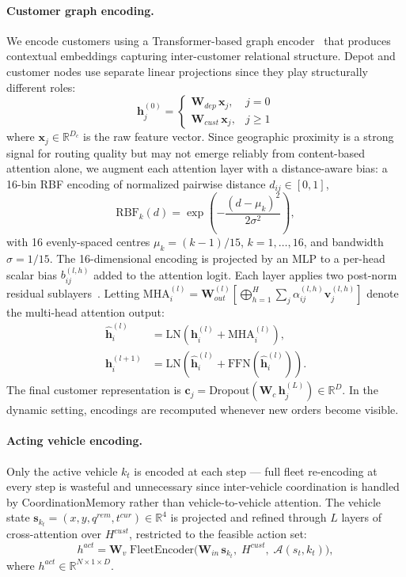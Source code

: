 \paragraph{Customer graph encoding.}
We encode customers using a Transformer-based graph encoder~\cite{vaswani2017attention} that produces contextual embeddings capturing inter-customer relational structure.
Depot and customer nodes use separate linear projections since they play structurally different roles:
\[
\mathbf{h}_j^{(0)} =
\begin{cases}
\mathbf{W}_{dep}\,\mathbf{x}_j, & j = 0 \\
\mathbf{W}_{cust}\,\mathbf{x}_j, & j \geq 1
\end{cases}
\]
where $\mathbf{x}_j \in \mathbb{R}^{D_c}$ is the raw feature vector.
Since geographic proximity is a strong signal for routing quality but may not emerge reliably from content-based attention alone, we augment each attention layer with a distance-aware bias: a 16-bin RBF encoding of normalized pairwise distance $d_{ij} \in [0,1]$,
\[
\mathrm{RBF}_k(d) = \exp\!\left(-\frac{(d - \mu_k)^2}{2\sigma^2}\right),
\]
with 16 evenly-spaced centres $\mu_k = (k-1)/15$, $k=1,\ldots,16$, and bandwidth $\sigma = 1/15$.
The 16-dimensional encoding is projected by an MLP to a per-head scalar bias $b_{ij}^{(l,h)}$ added to the attention logit.
Each layer applies two post-norm residual sublayers~\cite{vaswani2017attention}.
Letting $\mathrm{MHA}_i^{(l)} = \mathbf{W}_{out}^{(l)}\!\left[\bigoplus_{h=1}^{H}\sum_j \alpha_{ij}^{(l,h)}\mathbf{v}_j^{(l,h)}\right]$ denote the multi-head attention output:
\begin{align*}
\hat{\mathbf{h}}_i^{(l)} &= \mathrm{LN}\!\left(\mathbf{h}_i^{(l)} + \mathrm{MHA}_i^{(l)}\right), \\
\mathbf{h}_i^{(l+1)} &= \mathrm{LN}\!\left(\hat{\mathbf{h}}_i^{(l)} + \mathrm{FFN}\!\left(\hat{\mathbf{h}}_i^{(l)}\right)\right).
\end{align*}
The final customer representation is $\mathbf{c}_j = \mathrm{Dropout}(\mathbf{W}_c\,\mathbf{h}_j^{(L)}) \in \mathbb{R}^D$.
In the dynamic setting, encodings are recomputed whenever new orders become visible.

\paragraph{Acting vehicle encoding.}
Only the active vehicle $k_t$ is encoded at each step --- full fleet re-encoding at every step is wasteful and unnecessary since inter-vehicle coordination is handled by CoordinationMemory rather than vehicle-to-vehicle attention.
The vehicle state $\mathbf{s}_{k_t} = (x, y, q^{rem}, t^{cur}) \in \mathbb{R}^4$ is projected and refined through $L$ layers of cross-attention over $H^{cust}$, restricted to the feasible action set:
\[
h^{act} = \mathbf{W}_v\;\mathrm{FleetEncoder}\!\bigl(\mathbf{W}_{in}\,\mathbf{s}_{k_t},\; H^{cust},\; \mathcal{A}(s_t,k_t)\bigr),
\]
where $h^{act} \in \mathbb{R}^{N \times 1 \times D}$.

